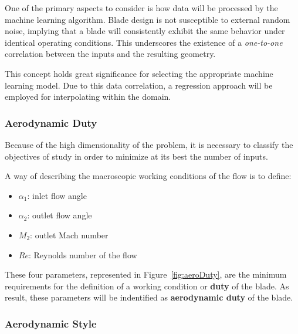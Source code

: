 
One of the primary aspects to consider is how data will be processed by the machine learning algorithm. Blade design is not susceptible to external random noise, implying that a blade will consistently exhibit the same behavior under identical operating conditions. This underscores the existence of a \textit{one-to-one} correlation between the inputs and the resulting geometry.

This concept holds great significance for selecting the appropriate machine learning model. Due to this data correlation, a regression approach will be employed for interpolating within the domain.

\subsubsection{Aerodynamic Duty}

Because of the high dimensionality of the problem, it is necessary to classify the objectives of study 
in order to minimize at its best the number of inputs. 



A way of describing the macroscopic working conditions of the flow is to define:

\begin{itemize}
    \item $\alpha_1$: inlet flow angle 
    \item $\alpha_2$: outlet flow angle 
    \item $M_2$: outlet Mach number 
    \item $Re$: Reynolds number of the flow
\end{itemize}

These four parameters, represented in Figure~\ref{fig:aeroDuty}, are the minimum requirements for the definition of a working condition or \textbf{duty}
of the blade. As result, these parameters will be indentified as \textbf{aerodynamic duty} of the blade.

\subsubsection{Aerodynamic Style}


